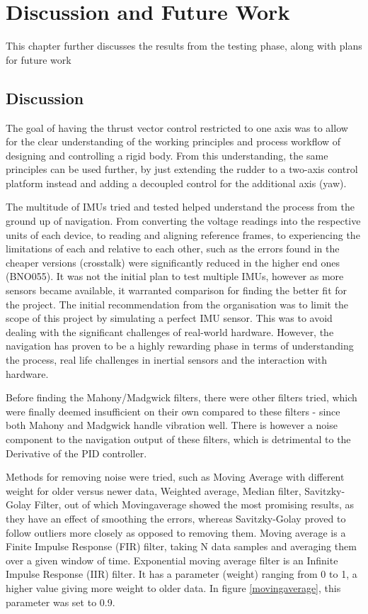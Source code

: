 \chapter{Discussion and Future Work}

This chapter further discusses the results from the testing phase, along with plans for future work

\section{Discussion}

The goal of having the thrust vector control restricted to one axis was to allow for the clear understanding of the working principles and process workflow of designing and controlling a rigid body. 
From this understanding, the same principles can be used further, by just extending the rudder to a two-axis control platform instead and adding a decoupled control for the additional axis (yaw). 

The multitude of IMUs tried and tested helped understand the process from the ground up of navigation. From converting the voltage readings into the respective units of each device, to reading and aligning reference frames, to experiencing the limitations of each and relative to each other, such as the errors found in the cheaper versions (crosstalk) were significantly reduced in the higher end ones (BNO055). It was not the initial plan to test multiple IMUs, however as more sensors became available, it warranted comparison for finding the better fit for the project. 
The initial recommendation from the organisation was to limit the scope of this project by simulating a perfect IMU sensor.
This was to avoid dealing with the significant challenges of real-world hardware. However, the navigation has proven to be a highly rewarding phase in terms of understanding the process, real life challenges in inertial sensors and the interaction with hardware.  
 
Before finding the Mahony/Madgwick filters, there were other filters tried, which were finally deemed insufficient on their own compared to these filters - since both Mahony and Madgwick handle vibration well. There is however a noise component to the navigation output of these filters, which is detrimental to the Derivative of the PID controller. 

Methods for removing noise were tried, such as Moving Average with different weight for older versus newer data, Weighted average, Median filter, Savitzky-Golay Filter, out of which Movingaverage showed the most promising results, as they have an effect of smoothing the errors, whereas Savitzky-Golay proved to follow outliers more closely as opposed to removing them. 
 Moving average is a Finite Impulse Response (FIR) filter, taking N data samples and averaging them over a given window of time. 
Exponential moving average filter is an Infinite Impulse Response (IIR) filter. It has a parameter (weight) ranging from 0 to 1, a higher value giving more weight to older data. In figure  \ref{movingaverage}, this parameter was set to 0.9. 

